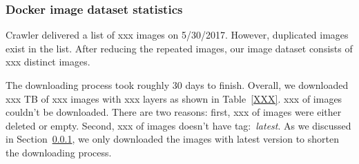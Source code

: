 

\subsubsection{Docker image dataset statistics}

Crawler delivered a list of xxx images on 5/30/2017. However, duplicated images exist in the list. After reducing the repeated images, our image dataset consists of xxx distinct images. 

The downloading process took roughly 30 days to finish. Overall, we downloaded xxx TB of xxx images with xxx layers as shown in Table~\ref{XXX}. xxx of images couldn't be downloaded. There are two reasons: first, xxx of images were either deleted or empty. Second, xxx of images doesn't have tag:~\textit{latest}. As we discussed in Section~\ref{}, we only downloaded the images with latest version to shorten the downloading process.




%
%

